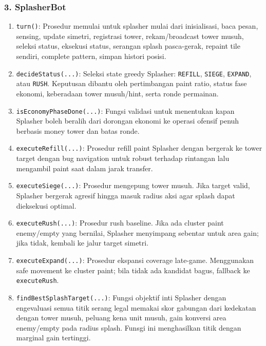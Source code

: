 \subsubsection{3. SplasherBot}
\begin{enumerate}
	\item \texttt{turn()}:
	      Prosedur memulai untuk splasher mulai dari inisialisasi, baca pesan, sensing, update simetri, registrasi tower, rekam/broadcast tower musuh, seleksi status, eksekusi status, serangan splash pasca-gerak, repaint tile sendiri, complete pattern, simpan histori posisi.

	\item \texttt{decideStatus(...)}:
	      Seleksi state greedy Splasher: \texttt{REFILL}, \texttt{SIEGE}, \texttt{EXPAND}, atau \texttt{RUSH}. Keputusan dibantu oleh pertimbangan paint ratio, status fase ekonomi, keberadaan tower musuh/hint, serta ronde permainan.

	\item \texttt{isEconomyPhaseDone(...)}:
	      Fungsi validasi untuk menentukan kapan Splasher boleh beralih dari dorongan ekonomi ke operasi ofensif penuh berbasis money tower dan batas ronde.

	\item \texttt{executeRefill(...)}:
	      Prosedur refill paint Splasher dengan bergerak ke tower target dengan bug navigation untuk robust terhadap rintangan lalu mengambil paint saat dalam jarak transfer.

	\item \texttt{executeSiege(...)}:
	      Prosedur mengepung tower musuh. Jika target valid, Splasher bergerak agresif hingga masuk radius aksi agar splash dapat dieksekusi optimal.

	\item \texttt{executeRush(...)}:
	      Prosedur rush baseline. Jika ada cluster paint enemy/empty yang bernilai, Splasher menyimpang sebentar untuk area gain; jika tidak, kembali ke jalur target simetri.

	\item \texttt{executeExpand(...)}:
	      Prosedur ekspansi coverage late-game. Menggunakan safe movement ke cluster paint; bila tidak ada kandidat bagus, fallback ke \texttt{executeRush}.

	\item \texttt{findBestSplashTarget(...)}:
	      Fungsi objektif inti Splasher dengan engevaluasi semua titik serang legal memakai skor gabungan dari kedekatan dengan tower musuh, peluang kena unit musuh, gain konversi area enemy/empty pada radius splash. Funsgi ini menghasilkan titik dengan marginal gain tertinggi.


\end{enumerate}
